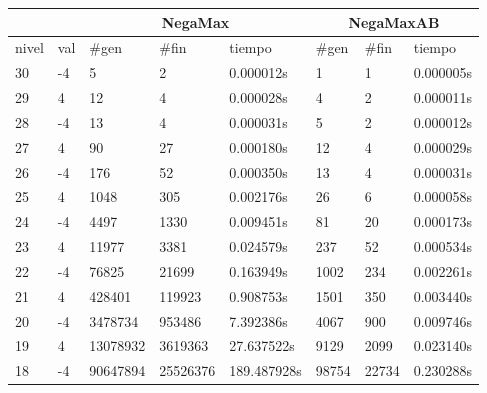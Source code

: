 \documentclass{article}
\begin{document}
\begin{table}[ht]
\begin{tabular}{|l|l|l|l|l|l|l|l|}
\hline
      &                & \multicolumn{3}{c|}{NegaMax}                      & \multicolumn{3}{c|}{NegaMaxAB}                  \\ \hline
nivel & val & \#gen & \#fin & tiempo         & \#gen & \#fin & tiempo         \\ \hline
30    & -4             & 5               & 2             & 0.000012s  & 1               & 1             & 0.000005s  \\ \hline
29    & 4              & 12              & 4             & 0.000028s  & 4               & 2             & 0.000011s  \\ \hline
28    & -4             & 13              & 4             & 0.000031s  & 5               & 2             & 0.000012s  \\ \hline
27    & 4              & 90              & 27            & 0.000180s  & 12              & 4             & 0.000029s  \\ \hline
26    & -4             & 176             & 52            & 0.000350s  & 13              & 4             & 0.000031s  \\ \hline
25    & 4              & 1048            & 305           & 0.002176s  & 26              & 6             & 0.000058s  \\ \hline
24    & -4             & 4497            & 1330          & 0.009451s  & 81              & 20            & 0.000173s  \\ \hline
23    & 4              & 11977           & 3381          & 0.024579s  & 237             & 52            & 0.000534s  \\ \hline
22    & -4             & 76825           & 21699         & 0.163949s  & 1002            & 234           & 0.002261s  \\ \hline
21    & 4              & 428401          & 119923        & 0.908753s  & 1501            & 350           & 0.003440s  \\ \hline
20    & -4             & 3478734         & 953486        & 7.392386s  & 4067            & 900           & 0.009746s  \\ \hline
19    & 4              & 13078932        & 3619363       & 27.637522s & 9129            & 2099          & 0.023140s  \\ \hline
18    & -4             & 90647894        & 25526376      & 189.487928s& 98754           & 22734         & 0.230288s  \\ \hline

\end{tabular}
\end{table}
\end{document}
